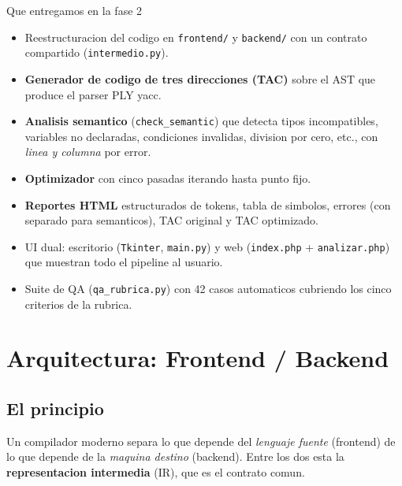 \documentclass[11pt,a4paper]{article}
\begin{document}
\begin{caja}{Que entregamos en la fase 2}
\begin{itemize}[leftmargin=*,nosep]
  \item Reestructuracion del codigo en \texttt{frontend/} y \texttt{backend/}
        con un contrato compartido (\texttt{intermedio.py}).
  \item \textbf{Generador de codigo de tres direcciones (TAC)} sobre el
        AST que produce el parser PLY yacc.
  \item \textbf{Analisis semantico} (\texttt{check\_semantic}) que detecta
        tipos incompatibles, variables no declaradas, condiciones invalidas,
        division por cero, etc., con \emph{linea y columna} por error.
  \item \textbf{Optimizador} con cinco pasadas iterando hasta punto fijo.
  \item \textbf{Reportes HTML} estructurados de tokens, tabla de simbolos,
        errores (con separado para semanticos), TAC original y TAC optimizado.
  \item UI dual: escritorio (\texttt{Tkinter}, \texttt{main.py}) y web
        (\texttt{index.php} + \texttt{analizar.php}) que muestran
        todo el pipeline al usuario.
  \item Suite de QA (\texttt{qa\_rubrica.py}) con 42 casos automaticos
        cubriendo los cinco criterios de la rubrica.
\end{itemize}
\end{caja}

\section{Arquitectura: Frontend / Backend}

\subsection{El principio}

Un compilador moderno separa lo que depende del \emph{lenguaje fuente}
(frontend) de lo que depende de la \emph{maquina destino} (backend). Entre
los dos esta la \textbf{representacion intermedia} (IR), que es el
contrato comun.
\end{document}
